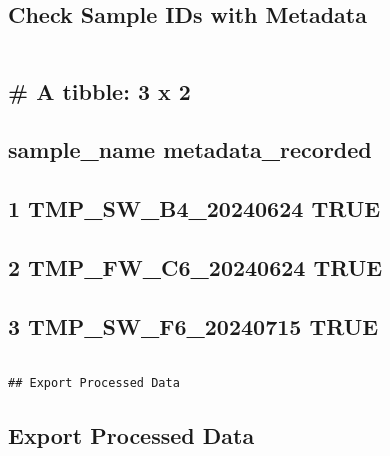 \documentclass[
]{article}
\begin{document}
\hypertarget{check-sample-ids-with-metadata}{%
\subsection{Check Sample IDs with
Metadata}\label{check-sample-ids-with-metadata}}

\begin{verbatim}
\end{verbatim}

\hypertarget{a-tibble-3-x-2}{%
\subsection{\# A tibble: 3 x 2}\label{a-tibble-3-x-2}}

\hypertarget{sample_name-metadata_recorded}{%
\subsection{sample\_name
metadata\_recorded}\label{sample_name-metadata_recorded}}

\hypertarget{section}{%
\subsection{\texorpdfstring{ }{ }}\label{section}}

\hypertarget{tmp_sw_b4_20240624-true}{%
\subsection{1 TMP\_SW\_B4\_20240624
TRUE}\label{tmp_sw_b4_20240624-true}}

\hypertarget{tmp_fw_c6_20240624-true}{%
\subsection{2 TMP\_FW\_C6\_20240624
TRUE}\label{tmp_fw_c6_20240624-true}}

\hypertarget{tmp_sw_f6_20240715-true}{%
\subsection{3 TMP\_SW\_F6\_20240715
TRUE}\label{tmp_sw_f6_20240715-true}}

\begin{verbatim}

## Export Processed Data  
\end{verbatim}

\hypertarget{export-processed-data}{%
\subsection{Export Processed Data}\label{export-processed-data}}
\end{document}
